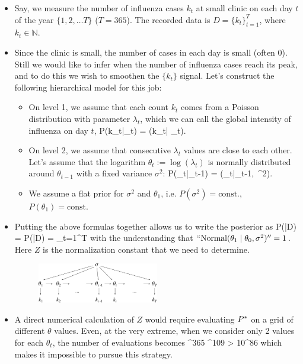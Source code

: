 \begin{itemize}
	\item Say, we measure the number of influenza cases $k_t$ at small clinic on each day $t$ of the year $\{1,2,\ldots T\}$ ($T = 365$). The recorded data is $D = \{k_t\}_{t=1}^T$, where $k_t\in\mathds{N}$.
	\item Since the clinic is small, the number of cases in each day is small (often 0). Still we would like to infer when the number of influenza cases reach its peak, and to do this we wish to smoothen the $\{k_t\}$ signal. Let's construct the following hierarchical model for this job:
	\begin{itemize}
		\item On level 1, we assume that each count $k_t$ comes from a Poisson distribution with parameter $\lambda_t$, which we can call the global intensity of influenza on day $t$, 
		\be
			P(k_t\;|\;\lambda_t) = (k_t\;|\; \lambda_t).
		\ee
		\item On level 2, we assume that consecutive $\lambda_t$ values are close to each other. Let's assume that the logarithm $\theta_t := \log(\lambda_t)$ is normally distributed around $\theta_{t-1}$ with a fixed variance $\sigma^2$: 
		\be
			P(\theta_t\;|\;\theta_{t-1}) = (\theta_t\;|\;\theta_{t-1}, \,\sigma^2).
		\ee
		\item We assume a flat prior for $\sigma^2$ and $\theta_1$, i.e. $P(\sigma^2) = \text{const.}$, $P(\theta_1) = \text{const.}$
	\end{itemize}
	\item Putting the above formulas together allows us to write the posterior as
	\be
		P(\theta\;|\;D) =  P\s(\theta\;|\;D) =  \prod_{t=1}^T 
	\ee
	with the understanding that $``\text{Normal}(\theta_{1}\;|\;\theta_{0}, \sigma^2)'' = 1$.
	Here $Z$ is the normalization constant that we need to determine.
	\begin{figure}[h]
	\centering
		\includegraphics[width=0.5\textwidth]{./figs/06-influenza.pdf}
	\end{figure}
	\item A direct numerical calculation of $Z$ would require evaluating $P^\ast$ on a grid of different $\theta$ values. Even, at the very extreme, when we consider only 2 values for each $\theta_t$, the number of evaluations becomes
	^{365} ^{109} > 10^{86} 
	\ee
	which makes it impossible to pursue this strategy.
\end{itemize}

